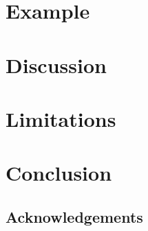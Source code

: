 \documentclass[acmlarge,review,anonymous]{acmart}\settopmatter{printfolios=true}
\begin{document}
\section{Example}
\label{sect.example}


\section{Discussion}
\label{sect.discussion}


\section{Limitations}
\label{sect.limitations}


\section{Conclusion}
\label{sect.conclusion}

\subsection*{Acknowledgements}

{}
\end{document}
